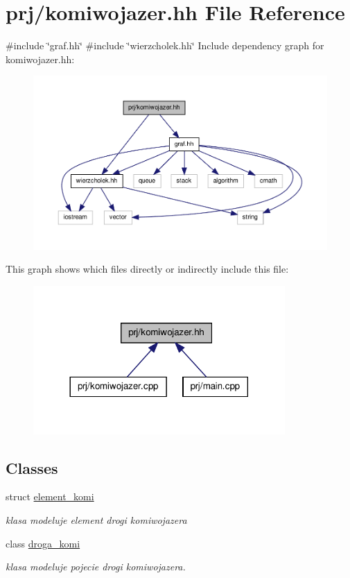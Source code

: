 \hypertarget{komiwojazer_8hh}{\section{prj/komiwojazer.hh \-File \-Reference}
\label{komiwojazer_8hh}
}
{\ttfamily \#include \char`\"{}graf.\-hh\char`\"{}}\*
{\ttfamily \#include \char`\"{}wierzcholek.\-hh\char`\"{}}\*
\-Include dependency graph for komiwojazer.\-hh\-:
\nopagebreak
\begin{figure}[H]
\begin{center}
\leavevmode
\includegraphics[width=350pt]{komiwojazer_8hh__incl}
\end{center}
\end{figure}
\-This graph shows which files directly or indirectly include this file\-:
\nopagebreak
\begin{figure}[H]
\begin{center}
\leavevmode
\includegraphics[width=272pt]{komiwojazer_8hh__dep__incl}
\end{center}
\end{figure}
\subsection*{\-Classes}
\begin{DoxyCompactItemize}
\item 
struct \hyperlink{structelement__komi}{element\-\_\-komi}
\begin{DoxyCompactList}\small\item\em klasa modeluje element drogi komiwojazera \end{DoxyCompactList}\item 
class \hyperlink{classdroga__komi}{droga\-\_\-komi}
\begin{DoxyCompactList}\small\item\em klasa modeluje pojecie drogi komiwojazera. \end{DoxyCompactList}\end{DoxyCompactItemize}
